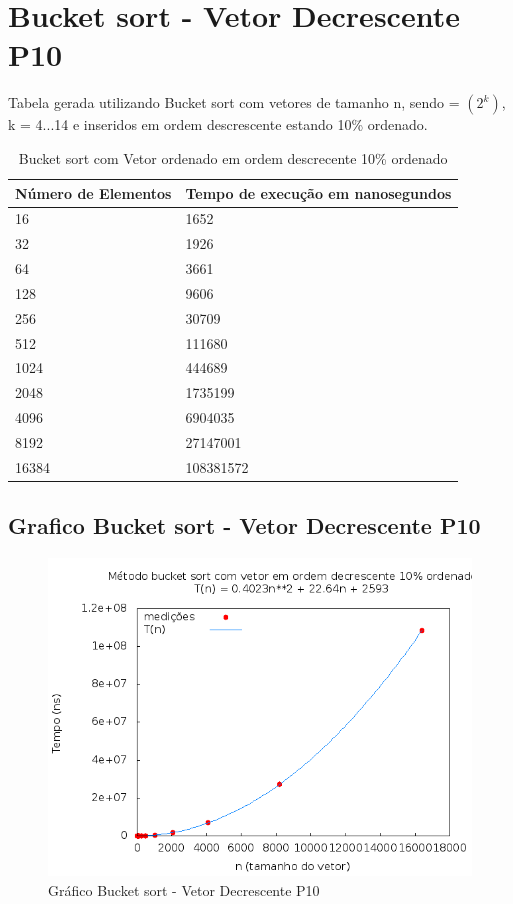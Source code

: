 \documentclass[12pt,a4paper,twoside]{report}
\begin{document}
\section{Bucket sort - Vetor Decrescente P10}
Tabela gerada utilizando Bucket sort com vetores de tamanho n, sendo = $(2^k)$, k = 4...14 e inseridos em ordem descrescente estando 10\% ordenado.

\begin{table}[H]
\centering
\caption{Bucket sort com Vetor ordenado em ordem descrecente 10\% ordenado}
\label{my-label}
\begin{tabular}{|l|l|}
\hline
\multicolumn{1}{|c|}{\textbf{Número de Elementos}} & \multicolumn{1}{c|}{\textbf{Tempo de execução em nanosegundos}} \\ \hline
16 & 1652 \\ \hline
32 & 1926 \\ \hline
64 & 3661 \\ \hline
128 & 9606 \\ \hline
256 & 30709 \\ \hline
512 & 111680 \\ \hline
1024 & 444689 \\ \hline
2048 & 1735199 \\ \hline
4096 & 6904035 \\ \hline
8192 & 27147001 \\ \hline
16384 & 108381572 \\ \hline
\end{tabular}
\end{table}

\subsection{Grafico Bucket sort - Vetor Decrescente P10}
\begin{figure}[H]
    \centering
    \includegraphics[width=0.7\linewidth]{graficos/Bucket/vIntDecrescenteP10/vIntDecrescenteP10.png}
  \caption{Gráfico Bucket sort - Vetor Decrescente P10}
\end{figure}
\end{document}
